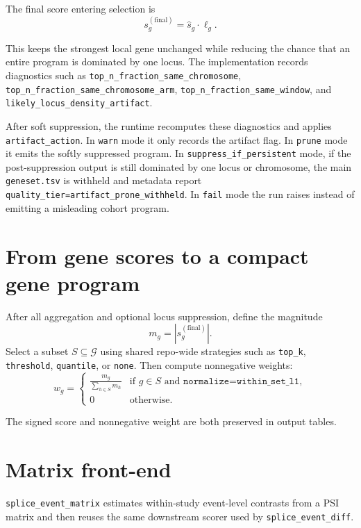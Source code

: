 \documentclass[11pt]{article}
\begin{document}
The final score entering selection is
\[
s_g^{(\mathrm{final})} = \widehat{s}_g \cdot \ell_g.
\]

This keeps the strongest local gene unchanged while reducing the chance that an entire program is dominated by one locus. The implementation records diagnostics such as \texttt{top\_n\_fraction\_same\_chromosome}, \texttt{top\_n\_fraction\_same\_chromosome\_arm}, \texttt{top\_n\_fraction\_same\_window}, and \texttt{likely\_locus\_density\_artifact}.

After soft suppression, the runtime recomputes these diagnostics and applies \texttt{artifact\_action}. In \texttt{warn} mode it only records the artifact flag. In \texttt{prune} mode it emits the softly suppressed program. In \texttt{suppress\_if\_persistent} mode, if the post-suppression output is still dominated by one locus or chromosome, the main \texttt{geneset.tsv} is withheld and metadata report \texttt{quality\_tier=artifact\_prone\_withheld}. In \texttt{fail} mode the run raises instead of emitting a misleading cohort program.

\section{From gene scores to a compact gene program}
After all aggregation and optional locus suppression, define the magnitude
\[
m_g = |s_g^{(\mathrm{final})}|.
\]
Select a subset $S \subseteq \mathcal{G}$ using shared repo-wide strategies such as \texttt{top\_k}, \texttt{threshold}, \texttt{quantile}, or \texttt{none}. Then compute nonnegative weights:
\begin{equation}
w_g =
\begin{cases}
\displaystyle \frac{m_g}{\sum_{h \in S} m_h} & \text{if } g \in S \text{ and } \texttt{normalize=within\_set\_l1},\\
0 & \text{otherwise.}
\end{cases}
\label{eq:weights}
\end{equation}

The signed score and nonnegative weight are both preserved in output tables.

\section{Matrix front-end}
\texttt{splice\_event\_matrix} estimates within-study event-level contrasts from a PSI matrix and then reuses the same downstream scorer used by \texttt{splice\_event\_diff}.
\end{document}
